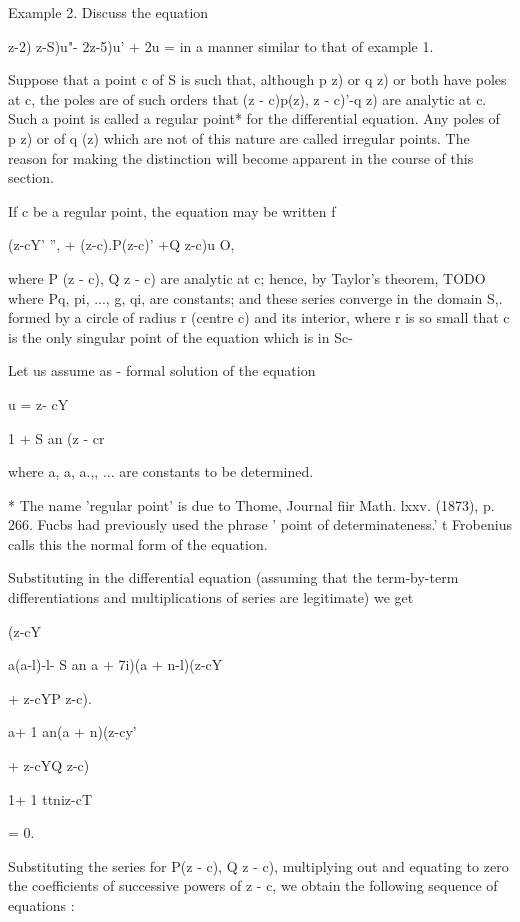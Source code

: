 Example 2. Discuss the equation

 z-2) z-S)u"- 2z-5)u' + 2u = in a manner similar to that of example 1.


Suppose that a point c of S is such that, although p z) or q z) or
both have poles at c, the poles are of such orders that (z - c)p(z), z
- c)'-q z) are analytic at c. Such a point is called a regular point*
for the differential equation. Any poles of p z) or of q (z) which are
not of this nature are called irregular points. The reason for making
the distinction will become apparent in the course of this section.

If c be a regular point, the equation may be written f

(z-cY' '', + (z-c).P(z-c)' +Q z-c)u O,

where P (z - c), Q z - c) are analytic at c; hence, by Taylor's
theorem,
TODO
where Pq, pi, ..., g, qi,  are constants; and these series
converge in the domain S,. formed by a circle of radius r (centre c)
and its interior, where r is so small that c is the only singular
point of the equation which is in Sc-

Let us assume as - formal solution of the equation

u = z- cY

1 + S an (z - cr

where a, a, a.,, ... are constants to be determined.

* The name 'regular point' is due to Thome, Journal fiir Math. lxxv.
(1873), p. 266. Fucbs had previously used the phrase ' point of
determinateness.' t Frobenius calls this the normal form of the
equation.

%
%

Substituting in the differential equation (assuming that the
term-by-term differentiations and multiplications of series are
legitimate) we get

(z-cY

a(a-l)-l- S an a + 7i)(a + n-l)(z-cY

+ z-cYP z-c).

a+ 1 an(a + n)(z-cy'

+ z-cYQ z-c)

1+ 1 ttniz-cT

= 0.

Substituting the series for P(z - c), Q z - c), multiplying out and
equating to zero the coefficients of successive powers of z - c, we
obtain the following sequence of equations :

